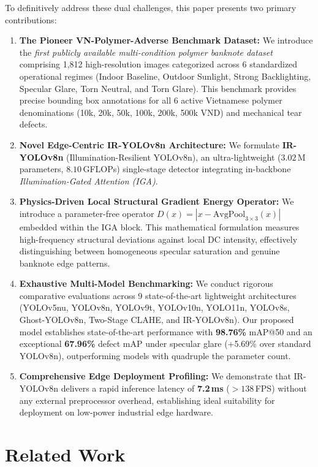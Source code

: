 \documentclass[twocolumn]{svjour3}
\begin{document}
To definitively address these dual challenges, this paper presents two primary contributions:
\begin{enumerate}
    \item \textbf{The Pioneer VN-Polymer-Adverse Benchmark Dataset:} We introduce the \textit{first publicly available multi-condition polymer banknote dataset} comprising 1,812 high-resolution images categorized across 6 standardized operational regimes (Indoor Baseline, Outdoor Sunlight, Strong Backlighting, Specular Glare, Torn Neutral, and Torn Glare). This benchmark provides precise bounding box annotations for all 6 active Vietnamese polymer denominations (10k, 20k, 50k, 100k, 200k, 500k VND) and mechanical tear defects.
    \item \textbf{Novel Edge-Centric IR-YOLOv8n Architecture:} We formulate \textbf{IR-YOLOv8n} (Illumination-Resilient YOLOv8n), an ultra-lightweight ($3.02$\,M parameters, $8.10$\,GFLOPs) single-stage detector integrating in-backbone \textit{Illumination-Gated Attention (IGA)}.
    \item \textbf{Physics-Driven Local Structural Gradient Energy Operator:} We introduce a parameter-free operator $D(x) = |x - \text{AvgPool}_{3\times 3}(x)|$ embedded within the IGA block. This mathematical formulation measures high-frequency structural deviations against local DC intensity, effectively distinguishing between homogeneous specular saturation and genuine banknote edge patterns.
    \item \textbf{Exhaustive Multi-Model Benchmarking:} We conduct rigorous comparative evaluations across 9 state-of-the-art lightweight architectures (YOLOv5nu, YOLOv8n, YOLOv9t, YOLOv10n, YOLO11n, YOLOv8s, Ghost-YOLOv8n, Two-Stage CLAHE, and IR-YOLOv8n). Our proposed model establishes state-of-the-art performance with \textbf{98.76\%} mAP@50 and an exceptional \textbf{67.96\%} defect mAP under specular glare (+5.69\% over standard YOLOv8n), outperforming models with quadruple the parameter count.
    \item \textbf{Comprehensive Edge Deployment Profiling:} We demonstrate that IR-YOLOv8n delivers a rapid inference latency of \textbf{7.2\,ms} ($>138$\,FPS) without any external preprocessor overhead, establishing ideal suitability for deployment on low-power industrial edge hardware.
\end{enumerate}

\section{Related Work}
\label{sec:related}
\end{document}
